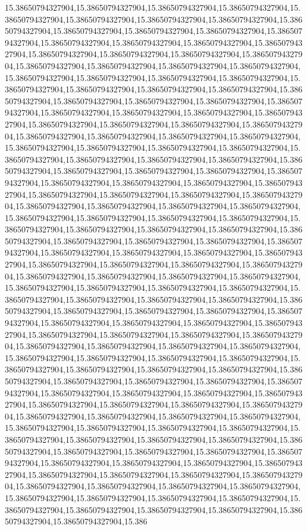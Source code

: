 15.38650794327904,15.38650794327904,15.38650794327904,15.38650794327904,15.38650794327904,15.38650794327904,15.38650794327904,15.38650794327904,15.38650794327904,15.38650794327904,15.38650794327904,15.38650794327904,15.38650794327904,15.38650794327904,15.38650794327904,15.38650794327904,15.38650794327904,15.38650794327904,15.38650794327904,15.38650794327904,15.38650794327904,15.38650794327904,15.38650794327904,15.38650794327904,15.38650794327904,15.38650794327904,15.38650794327904,15.38650794327904,15.38650794327904,15.38650794327904,15.38650794327904,15.38650794327904,15.38650794327904,15.38650794327904,15.38650794327904,15.38650794327904,15.38650794327904,15.38650794327904,15.38650794327904,15.38650794327904,15.38650794327904,15.38650794327904,15.38650794327904,15.38650794327904,15.38650794327904,15.38650794327904,15.38650794327904,15.38650794327904,15.38650794327904,15.38650794327904,15.38650794327904,15.38650794327904,15.38650794327904,15.38650794327904,15.38650794327904,15.38650794327904,15.38650794327904,15.38650794327904,15.38650794327904,15.38650794327904,15.38650794327904,15.38650794327904,15.38650794327904,15.38650794327904,15.38650794327904,15.38650794327904,15.38650794327904,15.38650794327904,15.38650794327904,15.38650794327904,15.38650794327904,15.38650794327904,15.38650794327904,15.38650794327904,15.38650794327904,15.38650794327904,15.38650794327904,15.38650794327904,15.38650794327904,15.38650794327904,15.38650794327904,15.38650794327904,15.38650794327904,15.38650794327904,15.38650794327904,15.38650794327904,15.38650794327904,15.38650794327904,15.38650794327904,15.38650794327904,15.38650794327904,15.38650794327904,15.38650794327904,15.38650794327904,15.38650794327904,15.38650794327904,15.38650794327904,15.38650794327904,15.38650794327904,15.38650794327904,15.38650794327904,15.38650794327904,15.38650794327904,15.38650794327904,15.38650794327904,15.38650794327904,15.38650794327904,15.38650794327904,15.38650794327904,15.38650794327904,15.38650794327904,15.38650794327904,15.38650794327904,15.38650794327904,15.38650794327904,15.38650794327904,15.38650794327904,15.38650794327904,15.38650794327904,15.38650794327904,15.38650794327904,15.38650794327904,15.38650794327904,15.38650794327904,15.38650794327904,15.38650794327904,15.38650794327904,15.38650794327904,15.38650794327904,15.38650794327904,15.38650794327904,15.38650794327904,15.38650794327904,15.38650794327904,15.38650794327904,15.38650794327904,15.38650794327904,15.38650794327904,15.38650794327904,15.38650794327904,15.38650794327904,15.38650794327904,15.38650794327904,15.38650794327904,15.38650794327904,15.38650794327904,15.38650794327904,15.38650794327904,15.38650794327904,15.38650794327904,15.38650794327904,15.38650794327904,15.38650794327904,15.38650794327904,15.38650794327904,15.38650794327904,15.38650794327904,15.38650794327904,15.38650794327904,15.38650794327904,15.38650794327904,15.38650794327904,15.38650794327904,15.38650794327904,15.38650794327904,15.38650794327904,15.38650794327904,15.38650794327904,15.38650794327904,15.38650794327904,15.38650794327904,15.38650794327904,15.38650794327904,15.38650794327904,15.38650794327904,15.38650794327904,15.38650794327904,15.38650794327904,15.38650794327904,15.38650794327904,15.38650794327904,15.38650794327904,15.38650794327904,15.38650794327904,15.38650794327904,15.386